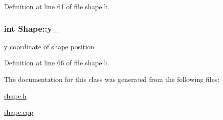 Definition at line 61 of file shape.\+h.

\hypertarget{class_shape_ae85309f9b9f6ecb7713ebe1d6891126b}{}
\subsubsection[{y\+\_\+}]{\setlength{\rightskip}{0pt plus 5cm}int Shape\+::y\+\_\+\hspace{0.3cm}{\ttfamily [protected]}}\label{class_shape_ae85309f9b9f6ecb7713ebe1d6891126b}
y coordinate of shape position 

Definition at line 66 of file shape.\+h.



The documentation for this class was generated from the following files\+:\begin{DoxyCompactItemize}
\item 
\hyperlink{shape_8h}{shape.\+h}\item 
\hyperlink{shape_8cpp}{shape.\+cpp}\end{DoxyCompactItemize}
